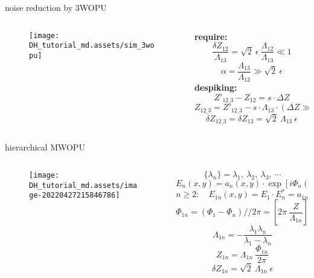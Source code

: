 \documentclass[t, aspectratio=169]{beamer}
\begin{document}
\begin{frame}{noise reduction by 3WOPU}
	\begin{columns}
		\begin{column}{.4\textwidth}
			\vspace{-5 mm}
			\begin{figure}
				\texttt{[image: DH\_tutorial\_md.assets/sim\_3wopu]}
			\end{figure}
		\end{column}
		\begin{column}{.6\textwidth}
\textbf{require: }
\[ \frac{\delta Z_{12}}{\Lambda_{13}} = \sqrt{2}\ \epsilon\ \frac{\Lambda_{12}}{\Lambda_{13}} \ll 1 \]
\[ \alpha = \frac{\Lambda_{13}}{\Lambda_{12}} \gg \sqrt{2}\ \epsilon \]
\pause
\textbf{despiking: }
\[ Z'_{12\_3} - Z_{12} = s\cdot\Delta Z \]
\[ Z_{12\_3} = Z'_{12\_3} - s\cdot\Lambda_{13}\cdot\left(\Delta Z \gg \delta Z_{13}\right)\  \]
\[ \delta Z_{12\_3} = \delta Z_{13} = \sqrt{2}\ \Lambda_{13}\ \epsilon \]
		\end{column}
	\end{columns}
\end{frame}


\begin{frame}{hierarchical MWOPU}
	\begin{columns}
		\begin{column}{0.4\textwidth}
			\vspace{-5 mm}
			\begin{figure}
				\texttt{[image: DH\_tutorial\_md.assets/image-20220427215846786]}
			\end{figure}
		\end{column}
		\begin{column}{0.6\textwidth}
\[ \{\lambda_n\} = \lambda_1,\ \lambda_2,\ \lambda_3,\ \cdots \]
\[ E_n(x,y) = a_n(x,y)\cdot\exp[i\Phi_n(x,y)] \]
\[ n \ge 2:\quad E_{1n}(x,y) = E_1\cdot E_n^* = a_{1n}(x,y)\cdot\exp[i\Phi_{1n}(x,y)] \]
\[ \Phi_{1n} = (\Phi_1 - \Phi_n)//2\pi = \left[ 2\pi\ \frac{Z}{\Lambda_{1n}} \right]\ //\ 2\pi \]
\[ \Lambda_{1n} = -\frac{\lambda_1\lambda_n}{\lambda_1 - \lambda_n} \]
\[ Z_{1n} = \Lambda_{1n}\ \frac{\Phi_{1n}}{2\pi} \]
\[ \delta Z_{1n} = \sqrt{2}\ \Lambda_{1n}\ \epsilon \]
		\end{column}
	\end{columns}
\end{frame}
\end{document}
